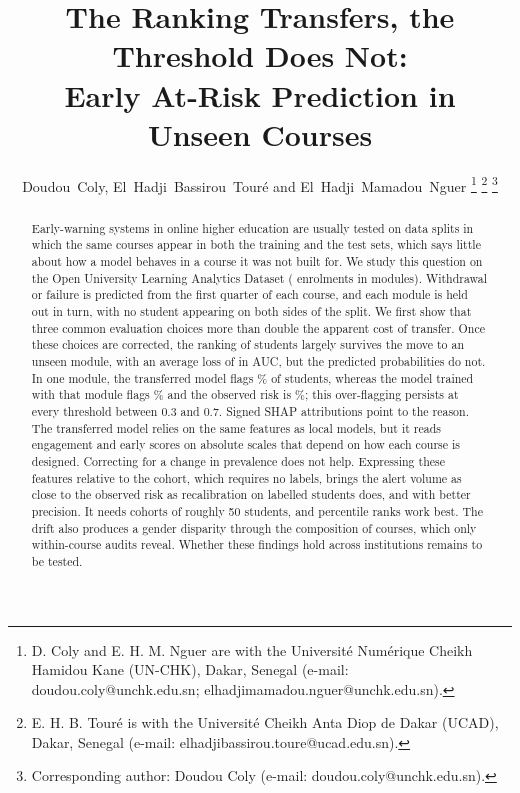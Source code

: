 \documentclass[journal]{IEEEtran}
\begin{document}
\title{The Ranking Transfers, the Threshold Does Not:\\ Early At-Risk Prediction in Unseen Courses}

\author{Doudou~Coly, El~Hadji~Bassirou~Tour\'e and El~Hadji~Mamadou~Nguer%
\thanks{D. Coly and E. H. M. Nguer are with the Universit\'e Num\'erique Cheikh Hamidou Kane (UN-CHK), Dakar, Senegal (e-mail: doudou.coly@unchk.edu.sn; elhadjimamadou.nguer@unchk.edu.sn).}%
\thanks{E. H. B. Tour\'e is with the Universit\'e Cheikh Anta Diop de Dakar (UCAD), Dakar, Senegal (e-mail: elhadjibassirou.toure@ucad.edu.sn).}%
\thanks{Corresponding author: Doudou Coly (e-mail: doudou.coly@unchk.edu.sn).}}


\maketitle

\begin{abstract}
Early-warning systems in online higher education are usually tested on data splits in which the same courses appear in both the training and the test sets, which says little about how a model behaves in a course it was not built for. We study this question on the Open University Learning Analytics Dataset (\resNEnrol{} enrolments in \resNModules{} modules). Withdrawal or failure is predicted from the first quarter of each course, and each module is held out in turn, with no student appearing on both sides of the split. We first show that three common evaluation choices more than double the apparent cost of transfer. Once these choices are corrected, the ranking of students largely survives the move to an unseen module, with an average loss of \resCostAbs{} in AUC, but the predicted probabilities do not. In one module, the transferred model flags \resGGGFlagB\% of students, whereas the model trained with that module flags \resGGGFlagA\% and the observed risk is \resGGGRisk\%; this over-flagging persists at every threshold between 0.3 and 0.7. Signed SHAP attributions point to the reason. The transferred model relies on the same features as local models, but it reads engagement and early scores on absolute scales that depend on how each course is designed. Correcting for a change in prevalence does not help. Expressing these features relative to the cohort, which requires no labels, brings the alert volume as close to the observed risk as recalibration on labelled students does, and with better precision. It needs cohorts of roughly 50 students, and percentile ranks work best. The drift also produces a gender disparity through the composition of courses, which only within-course audits reveal. Whether these findings hold across institutions remains to be tested.
\end{abstract}
\end{document}
